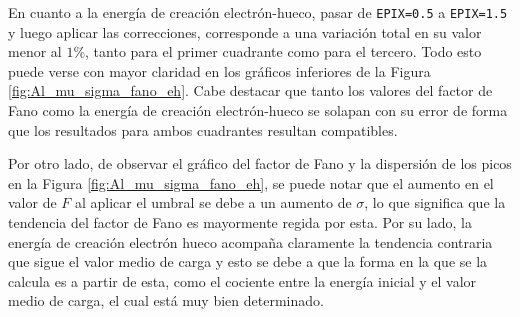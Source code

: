 En cuanto a la energía de creación electrón-hueco, pasar de \verb|EPIX=0.5| a \verb|EPIX=1.5| y luego aplicar las correcciones, corresponde a una variación total en su valor menor al $1\%$, tanto para el primer cuadrante como para el tercero. Todo esto puede verse con mayor claridad en los gráficos inferiores de la Figura \ref{fig:Al_mu_sigma_fano_eh}.
Cabe destacar que tanto los valores del factor de Fano como la energía de creación electrón-hueco se solapan con su error de forma que los resultados para ambos cuadrantes resultan compatibles. 

Por otro lado, de observar el gráfico del factor de Fano y la dispersión de los picos en la Figura \ref{fig:Al_mu_sigma_fano_eh}, se puede notar que el aumento en el valor de $F$ al aplicar el umbral se debe a un aumento de $\sigma$, lo que significa que la tendencia del factor de Fano es mayormente regida por esta. Por su lado, la energía de creación electrón hueco acompaña claramente la tendencia contraria que sigue el valor medio de carga y esto se debe a que la forma en la que se la calcula es a partir de esta, como el cociente entre la energía inicial y el valor medio de carga, el cual está muy bien determinado.

